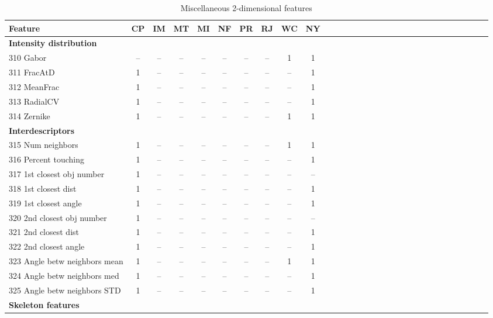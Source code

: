 \documentclass[sn-mathphys,Numbered]{sn-jnl}%
\theoremstyle{thmstyleone}%
\theoremstyle{thmstyletwo}%
\theoremstyle{thmstylethree}%
\begin{document}

\begin{table}[!hbt]
\centering
\caption {Miscellaneous 2-dimensional features}
\label {table:MISC}
\begin{tiny}
\begin{tabular} {
l  c  c  c  c  c  c  c  c  c  l  c  c  c  c  c  c  c  c  c  l  c  c  c  c  c  c  c  c  c
}
\toprule

Feature & CP &  IM &  MT &  MI & NF &  PR &  RJ & WC & NY \\
\midrule
\hspace{2mm}  \bf Intensity distribution \rm &  &  &  &  &  &  &  &  &  \\
 310 Gabor & -- & -- & -- & -- & -- & -- & -- & 1 & 1 \\
 311 FracAtD & 1 & -- & -- & -- & -- & -- & -- & -- & 1 \\
 312 MeanFrac & 1 & -- & -- & -- & -- & -- & -- & -- & 1 \\
 313 RadialCV & 1 & -- & -- & -- & -- & -- & -- & -- & 1 \\
 314 Zernike & 1 & -- & -- & -- & -- & -- & -- & 1 & 1 \\
\hspace{2mm}  \bf Interdescriptors \rm &  &  &  &  &  &  &  &  &  \\
 315 Num neighbors & 1 & -- & -- & -- & -- & -- & -- & 1 & 1 \\
 316 Percent touching & 1 & -- & -- & -- & -- & -- & -- & -- & 1 \\
 317 1st closest obj number & 1 & -- & -- & -- & -- & -- & -- & -- & -- \\
 318 1st closest dist & 1 & -- & -- & -- & -- & -- & -- & -- & 1 \\
 319 1st closest angle & 1 & -- & -- & -- & -- & -- & -- & -- & 1 \\
 320 2nd closest obj number & 1 & -- & -- & -- & -- & -- & -- & -- & -- \\
 321 2nd closest dist & 1 & -- & -- & -- & -- & -- & -- & -- & 1 \\
 322 2nd closest angle  & 1 & -- & -- & -- & -- & -- & -- & -- & 1 \\
 323 Angle betw neighbors mean & 1 & -- & -- & -- & -- & -- & -- & 1 & 1 \\
 324 Angle betw neighbors med & 1 & -- & -- & -- & -- & -- & -- & -- & 1 \\
 325 Angle betw neighbors STD & 1 & -- & -- & -- & -- & -- & -- & -- & 1 \\
\hspace{2mm}  \bf Skeleton features \rm &  &  &  &  &  &  &  &  &  \\

\end{tabular}
\end{tiny}
\end{table}
\end{document}
